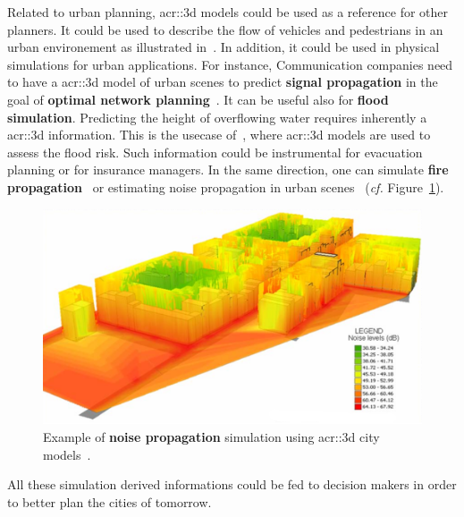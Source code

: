             Related to urban planning, \gls{acr::3d} models could be used as a reference for other planners.
            It could be used to describe the flow of vehicles and pedestrians in an urban environement as illustrated in~\textcite{vanhoey2017varcity}.
            In addition, it could be used in physical simulations for urban applications.
            For instance, Communication companies need to have a \gls{acr::3d} model of urban scenes to predict \textbf{signal propagation} in the goal of \textbf{optimal network planning}~\parencite{yun2007radio}.
            It can be useful also for \textbf{flood simulation}.
            Predicting the height of overflowing water requires inherently a \gls{acr::3d} information.
            This is the usecase of~\textcite{varduhn2015multi}, where \gls{acr::3d} models are used to assess the flood risk.
            Such information could be instrumental for evacuation planning or for insurance managers.
            In the same direction, one can simulate \textbf{fire propagation}~\parencite{dimitropoulos2010fire} or estimating noise propagation in urban scenes~\parencite{stoter20083d} (\textit{cf.} Figure~\ref{fig::noise_propogation}).
            \begin{figure}[htpb]
                \centering
                \includegraphics[width=\textwidth]{images/introduction/3d_model_applications/noise_simulation}
                \caption{
                    \label{fig::noise_propogation} Example of \textbf{noise propagation} simulation using \gls{acr::3d} city models~\parencite{kurakula2007gis}.
                }
            \end{figure}
            All these simulation derived informations could be fed to decision makers in order to better plan the cities of tomorrow.

